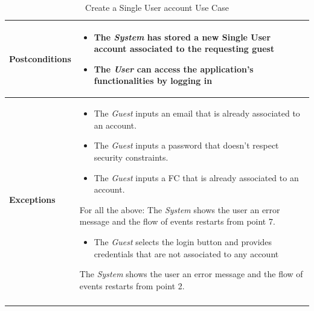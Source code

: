\documentclass[titlepage]{article}
\begin{document}
\begin{longtable}{| p{3 cm} | p{10 cm} |}
			 \\
			\hline
			{\bf Postconditions} & 
							\begin{itemize}
								\item The {\it System} has stored a new Single User account associated to the 										requesting guest
								\item The {\it User} can access the application’s functionalities by logging in
							\end{itemize}
			\\
			\hline
			{\bf Exceptions} & 
							\begin{itemize}
								\item The {\it Guest} inputs an email that is already associated to an account. 
								\item The {\it Guest} inputs a password that doesn’t respect security constraints. 								\item The 	{\it Guest} inputs a FC that is already associated to an account. 
							\end{itemize} 
							For all the above: The {\it System} shows the user an error message and the flow of events restarts from point 7.
							\begin{itemize}
								\item The {\it Guest}  selects the login button and provides credentials that are not 									associated to any account
							\end{itemize} 
							The {\it System} shows the user an error message and the flow of events 							restarts from point 2.
							
			\\
			\hline
			\caption{Create a Single User account Use Case}
			\end{longtable}
			
			
\end{document}
